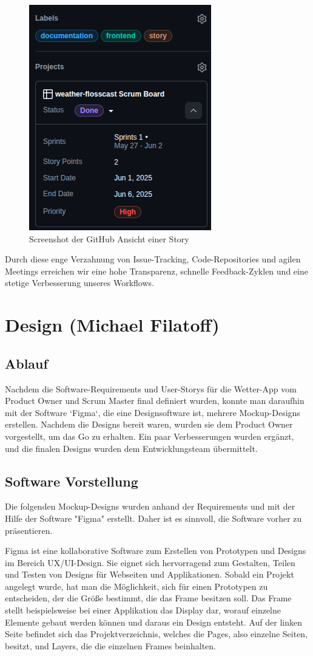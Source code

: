 \documentclass{article}
\begin{document}
\begin{figure}[h]
  \caption{Screenshot der GitHub Ansicht einer Story}
  \centering
  \includegraphics[width=.3\textwidth]{overview.png}
\end{figure}

Durch diese enge Verzahnung von Issue-Tracking, Code-Repositories und agilen Meetings erreichen wir eine hohe Transparenz, schnelle Feedback-Zyklen und eine stetige Verbesserung unseres Workflows.

\section{Design \small{(Michael Filatoff)}}
\subsection{Ablauf}
Nachdem die Software-Requirements und User-Storys für die Wetter-App vom Product Owner und Scrum Master final definiert wurden, konnte man daraufhin mit der Software `Figma`, die eine Designsoftware ist, mehrere Mockup-Designs erstellen. Nachdem die Designs bereit waren, wurden sie dem Product Owner vorgestellt, um das Go zu erhalten. Ein paar Verbesserungen wurden ergänzt, und die finalen Designs wurden dem Entwicklungsteam übermittelt.

\subsection{Software Vorstellung}
Die folgenden Mockup-Designs wurden anhand der Requirements und mit der Hilfe der Software "Figma" erstellt. Daher ist es sinnvoll, die Software vorher zu präsentieren.

Figma ist eine kollaborative Software zum Erstellen von Prototypen und Designs im Bereich UX/UI-Design. Sie eignet sich hervorragend zum Gestalten, Teilen und Testen von Designs für Webseiten und Applikationen. Sobald ein Projekt angelegt wurde, hat man die Möglichkeit, sich für einen Prototypen zu entscheiden, der die Größe bestimmt, die das Frame besitzen soll. Das Frame stellt beispielsweise bei einer Applikation das Display dar, worauf einzelne Elemente gebaut werden können und daraus ein Design entsteht. Auf der linken Seite  befindet sich das Projektverzeichnis, welches die Pages, also einzelne Seiten, besitzt, und Layers, die die einzelnen Frames beinhalten. 
\end{document}
